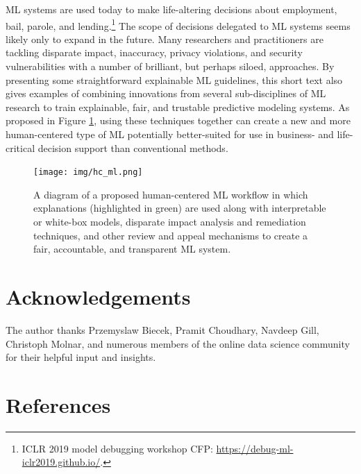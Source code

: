 \documentclass[fleqn]{article}
\begin{document}
ML systems are used today to make life-altering decisions about employment, bail, parole, and lending.\footnote{ICLR 2019 model debugging workshop CFP: \url{https://debug-ml-iclr2019.github.io/}.} The scope of decisions delegated to ML systems seems likely only to expand in the future. Many researchers and practitioners are tackling disparate impact, inaccuracy, privacy violations, and security vulnerabilities with a number of brilliant, but perhaps siloed, approaches. By presenting some straightforward explainable ML guidelines, this short text also gives examples of combining innovations from several sub-disciplines of ML research to train explainable, fair, and trustable predictive modeling systems. As proposed in Figure \ref{fig:hc_ml}, using these techniques together can create a new and more human-centered type of ML potentially better-suited for use in business- and life-critical decision support than conventional methods.\\

\vspace{150pt}

\begin{figure}[htb!]
	\begin{center}
		\texttt{[image: img/hc\_ml.png]}
		\caption{A diagram of a proposed human-centered ML workflow in which explanations (highlighted in green) are used along with interpretable or white-box models, disparate impact analysis and remediation techniques, and other review and appeal mechanisms to create a fair, accountable, and transparent ML system.}
		\label{fig:hc_ml}
	\end{center}
\end{figure}

\section*{Acknowledgements}

The author thanks Przemyslaw Biecek, Pramit Choudhary, Navdeep Gill, Christoph Molnar, and numerous members of the online data science community for their helpful input and insights. 

\section*{References}
\small


\end{document}
